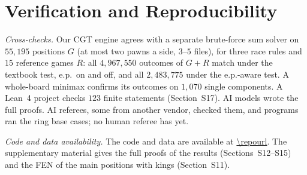 \providecommand{\codeavail}{available at \expandafter\url\expandafter{\repourl}}

\section{Verification and Reproducibility}\label{sec:verify}

\emph{Cross-checks.} Our CGT engine agrees with a separate brute-force sum solver on $55{,}195$ positions $G$
(at most two pawns a side, $3$--$5$ files), for three race rules and $15$ reference games $R$: all
$4{,}967{,}550$ outcomes of $G+R$ match under the textbook test, e.p.\ on and off, and all $2{,}483{,}775$
under the e.p.-aware test. A whole-board minimax confirms its outcomes on $1{,}070$ single components. A Lean~4
project checks $123$ finite statements (Section~S17). AI models wrote the full  proofs. AI referees, some from another vendor, checked them, and
programs ran the ring base cases; no human referee has yet.

\emph{Code and data availability.} The code and data are \codeavail. The supplementary material gives the
full proofs of the  results (Sections~S12--S15) and the FEN of the main positions with kings (Section~S11).
